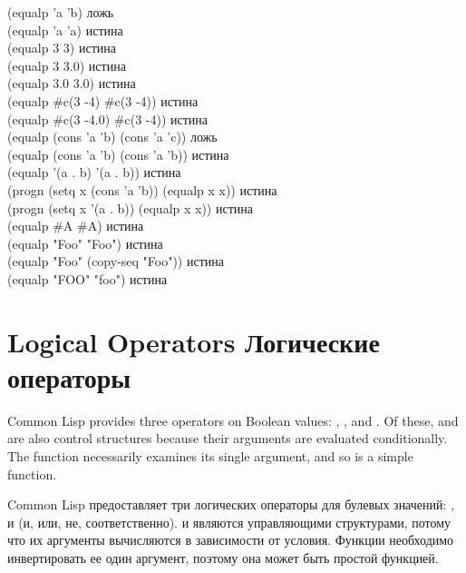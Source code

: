 \begin{defun}[Function]
\begin{lisp}
(equalp 'a 'b) \textrm{ложь} \\
(equalp 'a 'a) \textrm{истина} \\
(equalp 3 3) \textrm{истина} \\
(equalp 3 3.0) \textrm{истина} \\
(equalp 3.0 3.0) \textrm{истина} \\
(equalp \#c(3 -4) \#c(3 -4)) \textrm{истина} \\
(equalp \#c(3 -4.0) \#c(3 -4)) \textrm{истина} \\
(equalp (cons 'a 'b) (cons 'a 'c)) \textrm{ложь} \\
(equalp (cons 'a 'b) (cons 'a 'b)) \textrm{истина} \\
(equalp '(a . b) '(a . b)) \textrm{истина} \\
(progn (setq x (cons 'a 'b)) (equalp x x)) \textrm{истина} \\
(progn (setq x '(a . b)) (equalp x x)) \textrm{истина} \\
(equalp \#{\Xbackslash}A \#{\Xbackslash}A) \textrm{истина} \\
(equalp "Foo" "Foo") \textrm{истина} \\
(equalp "Foo" (copy-seq "Foo")) \textrm{истина} \\
(equalp "FOO" "foo") \textrm{истина}
\end{lisp}
\end{defun}

\section{Logical Operators Логические операторы}

Common Lisp provides three operators on Boolean values: , ,
and .  Of these,  and 
are also control structures because their arguments are evaluated
conditionally.
The function  necessarily examines its single argument, and so
is a simple function.

Common Lisp предоставляет три логических операторы для булевых значений:
,  и  (и, или, не, соответственно).  и
 являются управляющими структурами, потому что их аргументы
вычисляются в зависимости от условия.
Функции  необходимо инвертировать ее один аргумент, поэтому она может
быть простой функцией.

